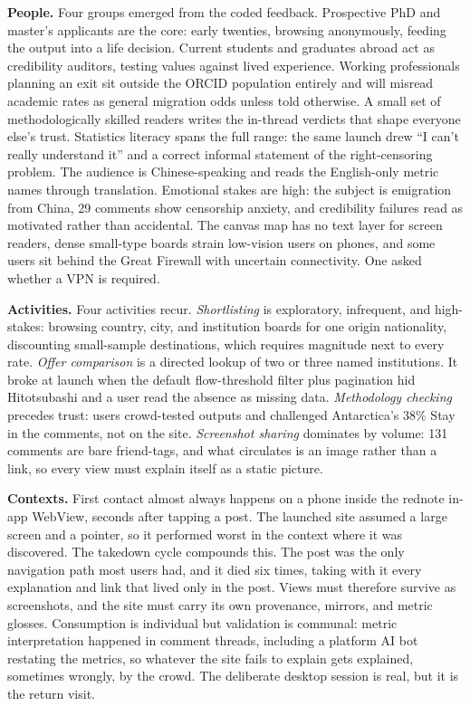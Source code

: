 \textbf{People.} Four groups emerged from the coded feedback. Prospective PhD and master's applicants are the core: early twenties, browsing anonymously, feeding the output into a life decision. Current students and graduates abroad act as credibility auditors, testing values against lived experience. Working professionals planning an exit sit outside the ORCID population entirely and will misread academic rates as general migration odds unless told otherwise. A small set of methodologically skilled readers writes the in-thread verdicts that shape everyone else's trust. Statistics literacy spans the full range: the same launch drew ``I can't really understand it'' and a correct informal statement of the right-censoring problem. The audience is Chinese-speaking and reads the English-only metric names through translation. Emotional stakes are high: the subject is emigration from China, 29 comments show censorship anxiety, and credibility failures read as motivated rather than accidental. The canvas map has no text layer for screen readers, dense small-type boards strain low-vision users on phones, and some users sit behind the Great Firewall with uncertain connectivity. One asked whether a VPN is required.

\textbf{Activities.} Four activities recur. \emph{Shortlisting} is exploratory, infrequent, and high-stakes: browsing country, city, and institution boards for one origin nationality, discounting small-sample destinations, which requires magnitude next to every rate. \emph{Offer comparison} is a directed lookup of two or three named institutions. It broke at launch when the default flow-threshold filter plus pagination hid Hitotsubashi and a user read the absence as missing data. \emph{Methodology checking} precedes trust: users crowd-tested outputs and challenged Antarctica's 38\% Stay in the comments, not on the site. \emph{Screenshot sharing} dominates by volume: 131 comments are bare friend-tags, and what circulates is an image rather than a link, so every view must explain itself as a static picture.

\textbf{Contexts.} First contact almost always happens on a phone inside the rednote in-app WebView, seconds after tapping a post. The launched site assumed a large screen and a pointer, so it performed worst in the context where it was discovered. The takedown cycle compounds this. The post was the only navigation path most users had, and it died six times, taking with it every explanation and link that lived only in the post. Views must therefore survive as screenshots, and the site must carry its own provenance, mirrors, and metric glosses. Consumption is individual but validation is communal: metric interpretation happened in comment threads, including a platform AI bot restating the metrics, so whatever the site fails to explain gets explained, sometimes wrongly, by the crowd. The deliberate desktop session is real, but it is the return visit.


